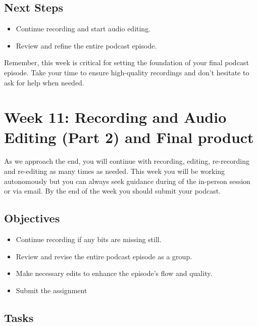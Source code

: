 \documentclass[
  letterpaper,
  DIV=11,
  numbers=noendperiod]{scrreprt}
\providecommand{\tightlist}{%
  \setlength{\itemsep}{0pt}\setlength{\parskip}{0pt}}\usepackage{longtable,booktabs,array}
\begin{document}
\section{Next Steps}\label{next-steps-10}

\begin{itemize}
\tightlist
\item
  Continue recording and start audio editing.
\item
  Review and refine the entire podcast episode.
\end{itemize}

Remember, this week is critical for setting the foundation of your final
podcast episode. Take your time to ensure high-quality recordings and
don't hesitate to ask for help when needed.

\chapter{Week 11: Recording and Audio Editing (Part 2) and Final
product}\label{week-11-recording-and-audio-editing-part-2-and-final-product}

As we approach the end, you will continue with recording, editing,
re-recording and re-editing as many times as needed. This week you will
be working autonomously but you can always seek guidance during of the
in-person session or via email. By the end of the week you should submit
your podcast.

\section{Objectives}\label{objectives-7}

\begin{itemize}
\tightlist
\item
  Continue recording if any bits are missing still.
\item
  Review and revise the entire podcast episode as a group.
\item
  Make necessary edits to enhance the episode's flow and quality.
\item
  Submit the assignment
\end{itemize}

\section{Tasks}\label{tasks-4}
\end{document}
